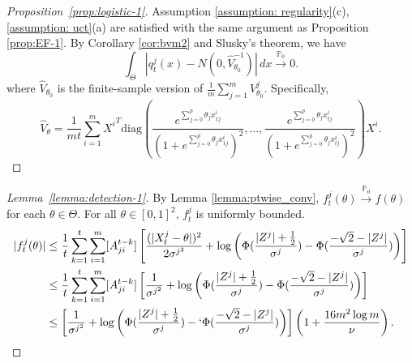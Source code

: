 \documentclass[twoside,11pt]{article}
\numberwithin{equation}{section}
\newcommand\bP{\mathbb{P}}
\newcommand{\pto}{\stackrel{\bP_0}{\to}}
\begin{document}
{\begin{proof}[Proposition~\ref{prop:logistic-1}]
Assumption \ref{assumption: regularity}(c), \ref{assumption: uct}(a) are satisfied with the same argument as Proposition \ref{prop:EF-1}.  By Corollary \ref{cor:bvm2} and Slusky's theorem, we have
\begin{equation*}
    \int_\Theta \left|q_t^j(x) - N(0, \hat V_{\theta_0}^{-1})\right| \, dx \pto 0.
\end{equation*}
where $\hat V_{\theta_0}$ is the finite-sample version of $\frac{1}{m} \sum_{j = 1}^m V_{\theta_0}^j$. Specifically,
\begin{equation*}
   \hat V_\theta = \frac{1}{m t} \sum_{i = 1}^m {X^i}^T  \text{diag}\left(
\frac{e^{\sum_{j=0}^{p} \theta_j x_{1j}^i}}{\left(1 + e^{\sum_{j=0}^{p} \theta_j x_{1j}^i}\right)^2},
\ldots,
\frac{e^{\sum_{j=0}^{p} \theta_j x_{tj}^i}}{\left(1 + e^{\sum_{j=0}^{p} \theta_j x_{tj}^i}\right)^2}
\right) X^i.
\end{equation*}
\end{proof}
\begin{proof}[Lemma~\ref{lemma:detection-1}]
    By Lemma \ref{lemma:ptwise_conv}, $f_t^j(\theta) \pto f(\theta)$ for each $\theta \in \Theta$.  For all $\theta \in [0,1]^2$, $f_t^j$ is uniformly bounded. 
\begin{align*}
|f_t^j(\theta)| &\leq \frac{1}{t} \sum_{k = 1}^t \sum_{i = 1}^m [A^{t-k}_{ji}] \left[\frac{(|X_t^j - \theta|)^2}{2 \sigma^{j^2}} + \log \left(\Phi(\frac{|Z^j|+ \frac{1}{2}}{\sigma^j}) - \Phi(\frac{- \sqrt{2} - |Z^j|}{\sigma^j}) \right) \right] \\
&\leq \frac{1}{t} \sum_{k = 1}^t \sum_{i = 1}^m [A^{t-k}_{ji}] \left[\frac{1}{\sigma^{j^2}}   +  \log \left(\Phi(\frac{|Z^j|+ \frac{1}{2}}{\sigma^j}) - \Phi(\frac{- \sqrt{2} - |Z^j|}{\sigma^j}) \right) \right] \\
&\leq \left[\frac{1}{\sigma^{j^2}}   +  \log \left(\Phi(\frac{|Z^j|+ \frac{1}{2}}{\sigma^j}) -    `{\Phi(\frac{- \sqrt{2} - |Z^j|}{\sigma^j}) } \right) \right] \left(1 + \frac{16 m^2 \log m}{\nu} \right). 
\end{align*}


\end{proof}}
\end{document}
